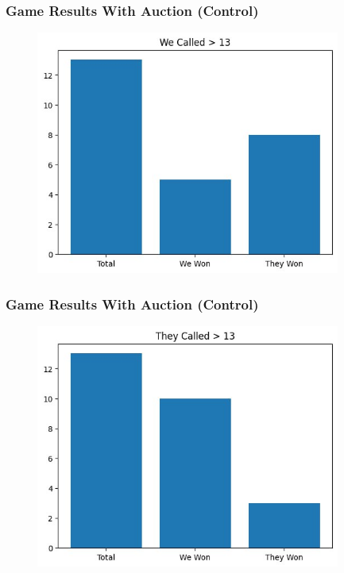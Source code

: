 \documentclass{beamer}
\begin{document}
\begin{frame}\frametitle{Game Results With Auction (Control)}
\begin{center}
        \begin{figure}
	    \includegraphics[width=10cm]{control3.png}
        \end{figure}
\end{center}
\end{frame}

\begin{frame}\frametitle{Game Results With Auction (Control)}
\begin{center}
        \begin{figure}
	    \includegraphics[width=10cm]{control4.png}
        \end{figure}
\end{center}
\end{frame}
\end{document}
